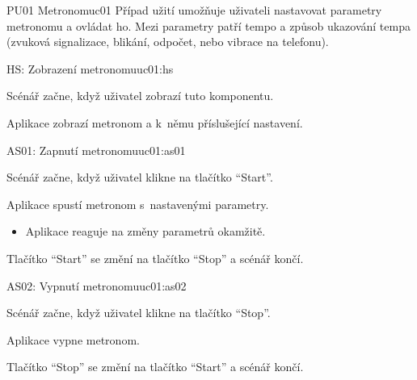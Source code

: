 \begin{usecase}{PU01 Metronom}{uc01}
    Případ užití umožňuje uživateli nastavovat parametry metronomu a ovládat ho. Mezi parametry patří tempo a způsob ukazování tempa (zvuková signalizace, blikání, odpočet, nebo vibrace na telefonu).

    \begin{scenario}{HS: Zobrazení metronomu}{uc01:hs}
        \item Scénář začne, když uživatel zobrazí tuto komponentu.
        \item Aplikace zobrazí metronom a k~němu příslušející nastavení.
    \end{scenario}

    \begin{scenario}{AS01: Zapnutí metronomu}{uc01:as01}
        \item Scénář začne, když uživatel klikne na tlačítko \enquote{Start}.
        \item Aplikace spustí metronom s~nastavenými parametry.
        \begin{itemize}
            \item Aplikace reaguje na změny parametrů okamžitě.
        \end{itemize}
        \item Tlačítko \enquote{Start} se změní na tlačítko \enquote{Stop} a scénář končí.
    \end{scenario}

    \begin{scenario}{AS02: Vypnutí metronomu}{uc01:as02}
        \item Scénář začne, když uživatel klikne na tlačítko \enquote{Stop}.
        \item Aplikace vypne metronom.
        \item Tlačítko \enquote{Stop} se změní na tlačítko \enquote{Start} a scénář končí.
    \end{scenario}
\end{usecase}